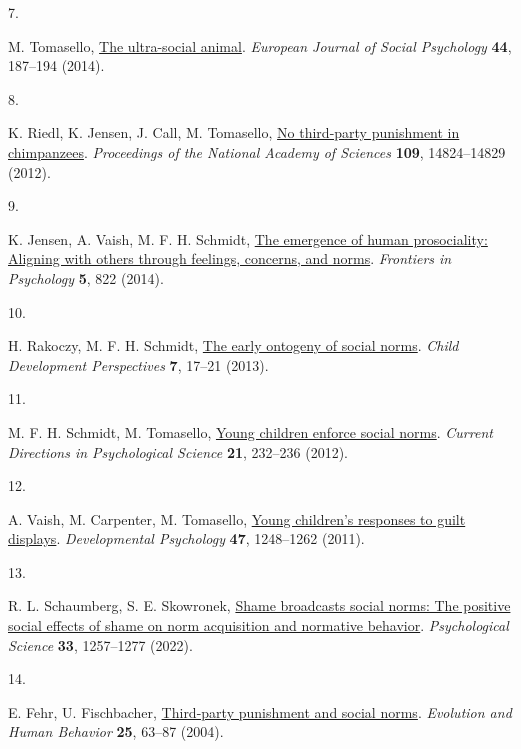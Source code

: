 \documentclass[
  man, donotrepeattitle,floatsintext]{apa6}
\newlength{\cslhangindent}
\newlength{\csllabelwidth}
\newlength{\cslentryspacingunit} %
\newenvironment{CSLReferences}[2] %
 {%
  \setlength{\parindent}{0pt}
  \ifodd #1
  \let\oldpar\par
  \def\par{\hangindent=\cslhangindent\oldpar}
  \fi
  \setlength{\parskip}{#2\cslentryspacingunit}
 }%
 {}
\newcommand{\CSLLeftMargin}[1]{\parbox[t]{\csllabelwidth}{#1}}
\newcommand{\CSLRightInline}[1]{\parbox[t]{\linewidth - \csllabelwidth}{#1}\break}
\begin{document}
\begin{CSLReferences}{0}{0}
\leavevmode{}%
\CSLLeftMargin{7. }%
\CSLRightInline{M. Tomasello, \href{https://doi.org/10.1002/ejsp.2015}{The ultra-social animal}. \emph{European Journal of Social Psychology} \textbf{44}, 187--194 (2014).}

\leavevmode{}%
\CSLLeftMargin{8. }%
\CSLRightInline{K. Riedl, K. Jensen, J. Call, M. Tomasello, \href{https://doi.org/10.1073/pnas.1203179109}{No third-party punishment in chimpanzees}. \emph{Proceedings of the National Academy of Sciences} \textbf{109}, 14824--14829 (2012).}

\leavevmode{}%
\CSLLeftMargin{9. }%
\CSLRightInline{K. Jensen, A. Vaish, M. F. H. Schmidt, \href{https://doi.org/10.3389/fpsyg.2014.00822}{The emergence of human prosociality: Aligning with others through feelings, concerns, and norms}. \emph{Frontiers in Psychology} \textbf{5}, 822 (2014).}

\leavevmode{}%
\CSLLeftMargin{10. }%
\CSLRightInline{H. Rakoczy, M. F. H. Schmidt, \href{https://doi.org/10.1111/cdep.12010}{The early ontogeny of social norms}. \emph{Child Development Perspectives} \textbf{7}, 17--21 (2013).}

\leavevmode{}%
\CSLLeftMargin{11. }%
\CSLRightInline{M. F. H. Schmidt, M. Tomasello, \href{https://doi.org/10.1177/0963721412448659}{Young children enforce social norms}. \emph{Current Directions in Psychological Science} \textbf{21}, 232--236 (2012).}

\leavevmode{}%
\CSLLeftMargin{12. }%
\CSLRightInline{A. Vaish, M. Carpenter, M. Tomasello, \href{https://doi.org/10.1037/a0024462}{Young children's responses to guilt displays}. \emph{Developmental Psychology} \textbf{47}, 1248--1262 (2011).}

\leavevmode{}%
\CSLLeftMargin{13. }%
\CSLRightInline{R. L. Schaumberg, S. E. Skowronek, \href{https://doi.org/10.1177/09567976221075303}{Shame broadcasts social norms: The positive social effects of shame on norm acquisition and normative behavior}. \emph{Psychological Science} \textbf{33}, 1257--1277 (2022).}

\leavevmode{}%
\CSLLeftMargin{14. }%
\CSLRightInline{E. Fehr, U. Fischbacher, \href{https://doi.org/10.1016/S1090-5138(04)00005-4}{Third-party punishment and social norms}. \emph{Evolution and Human Behavior} \textbf{25}, 63--87 (2004).}


\end{CSLReferences}
\end{document}
